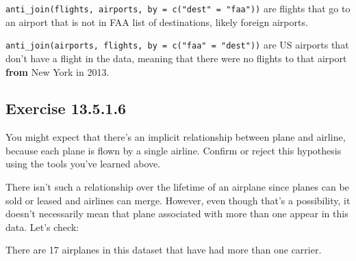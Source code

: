 \documentclass[]{book}
\newenvironment{Shaded}{\begin{snugshade}}{\end{snugshade}}
\newcommand{\CommentTok}[1]{\textcolor[rgb]{0.56,0.35,0.01}{\textit{#1}}}
\newcommand{\DecValTok}[1]{\textcolor[rgb]{0.00,0.00,0.81}{#1}}
\newcommand{\KeywordTok}[1]{\textcolor[rgb]{0.13,0.29,0.53}{\textbf{#1}}}
\newcommand{\NormalTok}[1]{#1}
\newcommand{\OperatorTok}[1]{\textcolor[rgb]{0.81,0.36,0.00}{\textbf{#1}}}
\newcommand{\StringTok}[1]{\textcolor[rgb]{0.31,0.60,0.02}{#1}}
\theoremstyle{plain}
\theoremstyle{remark}
\begin{document}
\texttt{anti\_join(flights,\ airports,\ by\ =\ c("dest"\ =\ "faa"))} are
flights that go to an airport that is not in FAA list of destinations,
likely foreign airports.

\texttt{anti\_join(airports,\ flights,\ by\ =\ c("faa"\ =\ "dest"))} are
US airports that don't have a flight in the data, meaning that there
were no flights to that airport \textbf{from} New York in 2013.

\hypertarget{exercise-13.5.1.6}{%
\subsection*{\texorpdfstring{Exercise
{13.5.1.6}}{Exercise 13.5.1.6}}\label{exercise-13.5.1.6}}

You might expect that there's an implicit relationship between plane and
airline, because each plane is flown by a single airline. Confirm or
reject this hypothesis using the tools you've learned above.

There isn't such a relationship over the lifetime of an airplane since
planes can be sold or leased and airlines can merge. However, even
though that's a possibility, it doesn't necessarily mean that plane
associated with more than one appear in this data. Let's check:

\begin{Shaded}
\end{Shaded}

There are 17 airplanes in this dataset that have had more than one
carrier.
\end{document}
